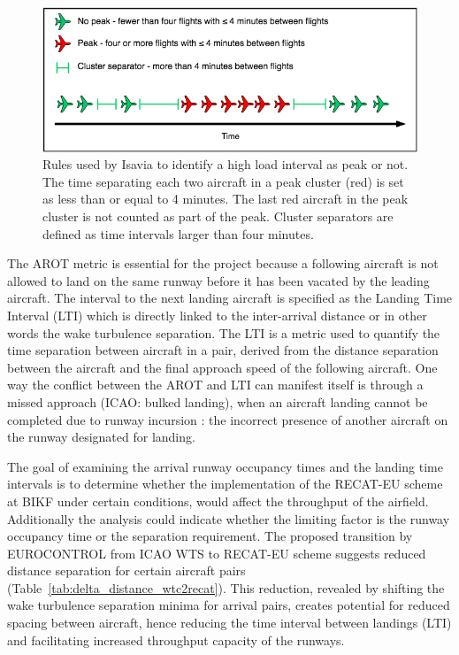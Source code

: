 \begin{figure}[h]
    \centering
    \includegraphics[width=1\textwidth]{graphics/Peak_Diagram.png}
    \caption[Rules defining a peak hour]{Rules used by Isavia to identify a high load interval as peak or not. The time separating each two aircraft in a peak cluster (red) is set as less than or equal to 4 minutes. The last red aircraft in the peak cluster is not counted as part of the peak. Cluster separators are defined as time intervals larger than four minutes.}
    \label{fig:Peak_Diagram}
\end{figure}

The AROT metric is essential for the project because a following aircraft is not allowed to land on the same runway before it has been vacated by the leading aircraft. The interval to the next landing aircraft is specified as the Landing Time Interval (LTI) which is directly linked to the inter-arrival distance or in other words the wake turbulence separation. The LTI is a metric used to quantify the time separation between aircraft in a pair, derived from the distance separation between the aircraft and the final approach speed of the following aircraft. One way the conflict between the AROT and LTI can manifest itself is through a missed approach (ICAO: bulked landing), when an aircraft landing cannot be completed due to runway incursion \cite{doc44444}: the incorrect presence of another aircraft on the runway designated for landing.%

The goal of examining the arrival runway occupancy times and the landing time intervals is to determine whether the implementation of the RECAT-EU scheme at BIKF under certain conditions, would affect the throughput of the airfield. Additionally the analysis could indicate whether the limiting factor is the runway occupancy time or the separation requirement. The proposed transition by EUROCONTROL from ICAO WTS to RECAT-EU scheme suggests reduced distance separation for certain aircraft pairs (Table~\ref{tab:delta_distance_wtc2recat}). This reduction, revealed by shifting the wake turbulence separation minima for arrival pairs, creates potential for reduced spacing between aircraft, hence reducing the time interval between landings (LTI) and facilitating increased throughput capacity of the runways. 

